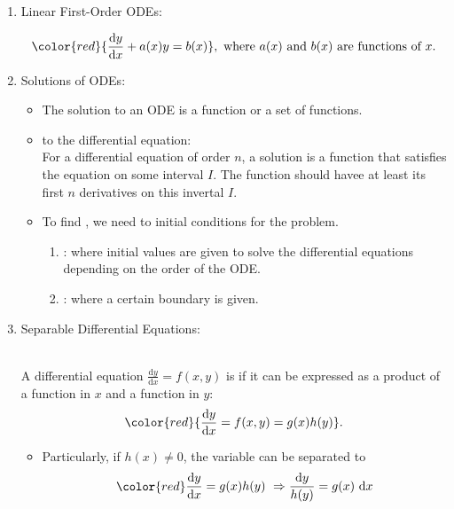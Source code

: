 \documentclass[12pt, a4paper]{article}
\def\d{{\mathrm{d}}}
\begin{document}
\begin{enumerate}
    \item Linear First-Order ODEs: 
    \begin{myclaim}{ }{}
        $${\color{red}{\frac{\d y}{\d x}+a(x)y=b(x)}},\text{ where }a(x)\text{ and }b(x)\text{ are functions of }x.$$
    \end{myclaim}
    \item Solutions of ODEs: 
    \begin{itemize}
        \item The solution to an ODE is a function or a set of functions.
        \item {\color{red}{General solution}} to the differential equation: \\
        For a differential equation of order $n$, a solution is a function that satisfies the equation on some interval $I$. The function should havee at least its first $n$ derivatives on this invertal $I$. 
        \item To find {\color{red}{particular solutions}}, we need to initial conditions for the problem. 
        \begin{enumerate}
            \item {\color{red}{Initial Value Problem (IVP)}}: where initial values are given to solve the differential equations depending on the order of the ODE. \\
            {\color{green}{E.g. $y(0),\ t(0),\ (0,y)$.}}
            \item {\color{red}{Boundary Value Problem}}: where a certain boundary is given. \\
            {\color{green}{E.g. $(x,y)$.}}
        \end{enumerate}
    \end{itemize}
    \item Separable Differential Equations: 
    \begin{myclaim}{ }{}
        \\A differential equation $\frac{\d y}{\d x}=f(x,y)$ is \textbf{\color{red}{separable}} if it can be expressed as a product of a function in $x$ and a function in $y$: 
        $${\color{red}{\frac{\d y}{\d x}=f(x,y)=g(x)h(y)}}.$$
    \end{myclaim}
    \begin{itemize}
        \item Particularly, if $h(x)\neq 0$, the variable can be separated to 
        $$\color{red}\begin{aligned}
            {\frac{\d y}{\d x}=g(x)h(y)}\ \Rightarrow \frac{\d y}{h(y)}&=g(x)\ \d x\\

\end{aligned}$$
\end{itemize}
\end{enumerate}
\end{document}
